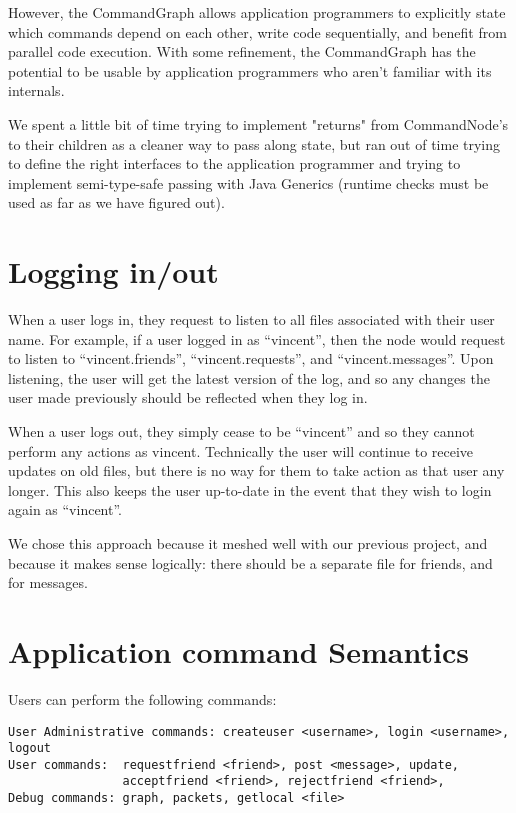 \documentclass[11pt]{article}
\begin{document}
However, the CommandGraph allows application programmers to explicitly state which commands depend on each other, write code sequentially,
and benefit from parallel code execution. With some refinement, the CommandGraph has the potential to be usable by application programmers who
aren't familiar with its internals.

We spent a little bit of time trying to implement "returns" from CommandNode's to their children as a cleaner way to pass along state,
but ran out of time trying to define the right interfaces to the application programmer and trying to implement semi-type-safe passing
with Java Generics (runtime checks must be used as far as we have figured out).

\section{Logging in/out}

When a user logs in, they request to listen to all files associated with their user name. For example, if a user logged in as ``vincent'', then the node would request to listen to ``vincent.friends'', ``vincent.requests'', and ``vincent.messages''. Upon listening, the user will get the latest version of the log, and so any changes the user made previously should be reflected when they log in. 

When a user logs out, they simply cease to be ``vincent'' and so they cannot perform any actions as vincent. Technically the user will continue to receive updates on old files, but there is no way for them to take action as that user any longer. This also keeps the user up-to-date in the event that they wish to login again as ``vincent''.

We chose this approach because it meshed well with our previous project, and because it makes sense logically: there should be a separate file for friends, and for messages. 

\section{Application command Semantics}

Users can perform the following commands:
\begin{verbatim}
User Administrative commands: createuser <username>, login <username>, logout
User commands:  requestfriend <friend>, post <message>, update, 
                acceptfriend <friend>, rejectfriend <friend>,
Debug commands: graph, packets, getlocal <file>
\end{verbatim}
\end{document}
